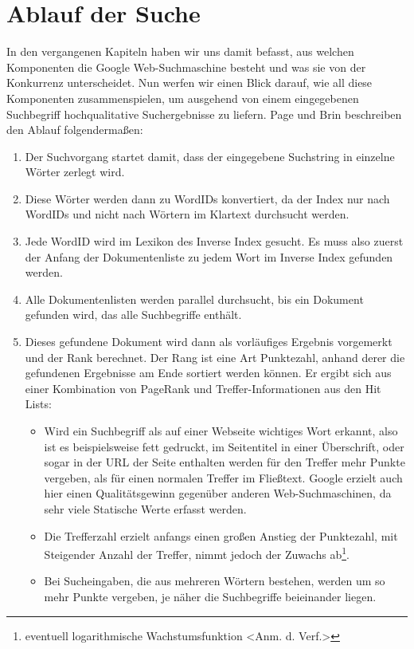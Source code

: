 \documentclass[12pt, a4paper]{llncs}
\begin{document}
	\section{Ablauf der Suche}
	In den vergangenen Kapiteln haben wir uns damit befasst, aus welchen Komponenten die Google Web-Suchmaschine besteht und was sie von der Konkurrenz unterscheidet.
	Nun werfen wir einen Blick darauf, wie all diese Komponenten zusammenspielen, um ausgehend von einem eingegebenen Suchbegriff hochqualitative Suchergebnisse zu
	liefern. Page und Brin\cite{page98} beschreiben den Ablauf folgendermaßen:
	\begin{enumerate}
	\item Der Suchvorgang startet damit, dass der eingegebene Suchstring in einzelne Wörter zerlegt wird.
	\item Diese Wörter werden dann zu WordIDs konvertiert, da der Index nur nach WordIDs und nicht nach Wörtern im Klartext durchsucht werden.
	\item Jede WordID wird im Lexikon des Inverse Index gesucht. Es muss also zuerst der Anfang der Dokumentenliste zu jedem Wort im Inverse Index gefunden werden.
	\item Alle Dokumentenlisten werden parallel durchsucht, bis ein Dokument gefunden wird, das alle Suchbegriffe enthält.
	\item Dieses gefundene Dokument wird dann als vorläufiges Ergebnis vorgemerkt und der Rank berechnet. Der Rang ist eine Art Punktezahl, anhand derer
		die gefundenen Ergebnisse am Ende sortiert werden können. Er ergibt sich aus einer Kombination von PageRank und Treffer-Informationen aus den Hit Lists:
	\begin{itemize}
		\item Wird ein Suchbegriff als auf einer Webseite wichtiges Wort erkannt, also ist es beispielsweise fett gedruckt, im Seitentitel in einer Überschrift, oder
			sogar in der URL der Seite enthalten werden für den Treffer mehr Punkte vergeben, als für einen normalen Treffer im Fließtext. Google erzielt auch hier
			einen Qualitätsgewinn gegenüber anderen Web-Suchmaschinen, da sehr viele Statische Werte erfasst werden.
		\item Die Trefferzahl erzielt anfangs einen großen Anstieg der Punktezahl, mit Steigender Anzahl der Treffer, nimmt jedoch der Zuwachs ab\footnote{eventuell
			logarithmische Wachstumsfunktion \textless Anm. d. Verf.\textgreater}.
		\item Bei Sucheingaben, die aus mehreren Wörtern bestehen, werden um so mehr Punkte vergeben, je näher die Suchbegriffe beieinander liegen.

\end{itemize}
\end{enumerate}
\end{document}
